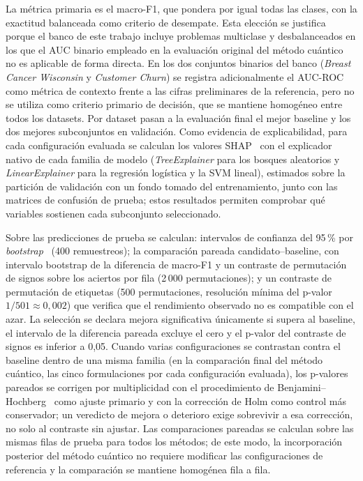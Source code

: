La métrica primaria es el macro-F1, que pondera por igual todas las
clases, con la exactitud balanceada como criterio de desempate. Esta
elección se justifica porque el banco de este trabajo incluye problemas
multiclase y desbalanceados en los que el AUC binario empleado en la
evaluación original del método cuántico~\cite{orquin2026} no es
aplicable de forma directa. En los dos conjuntos binarios del banco
(\textit{Breast Cancer Wisconsin} y \textit{Customer Churn}) se
registra adicionalmente el AUC-ROC como métrica de contexto frente a
las cifras preliminares de la referencia, pero no se utiliza como criterio primario de
decisión, que se mantiene homogéneo entre todos los datasets.
Por dataset pasan a la evaluación final el mejor baseline y los dos
mejores subconjuntos en validación. Como evidencia de explicabilidad,
para cada configuración evaluada se calculan los valores
SHAP~\cite{lundberg2017} con el explicador nativo de cada familia de
modelo (\textit{TreeExplainer} para los bosques aleatorios y
\textit{LinearExplainer} para la regresión logística y la SVM lineal),
estimados sobre la partición de validación con un fondo tomado del
entrenamiento, junto con las matrices de confusión de prueba; estos
resultados permiten comprobar qué variables sostienen cada subconjunto
seleccionado.

Sobre las predicciones de prueba se calculan: intervalos de confianza
del 95\,\% por \textit{bootstrap}~\cite{efron1979} (400 remuestreos);
la comparación pareada candidato--baseline, con intervalo bootstrap de
la diferencia de macro-F1 y un contraste de permutación de signos
sobre los aciertos por fila (2\,000 permutaciones); y un contraste de
permutación de etiquetas (500 permutaciones, resolución mínima del
p-valor $1/501 \approx 0{,}002$) que verifica que el rendimiento
observado no es compatible con el azar. La selección se declara mejora
significativa únicamente si supera al baseline, el intervalo de la
diferencia pareada excluye el cero y el p-valor del contraste de
signos es inferior a 0{,}05. Cuando varias configuraciones se contrastan
contra el baseline dentro de una misma familia (en la comparación final
del método cuántico, las cinco formulaciones por cada configuración
evaluada), los p-valores pareados se corrigen por multiplicidad con el
procedimiento de Benjamini--Hochberg~\cite{benjamini1995} como ajuste
primario y con la corrección de Holm como control más conservador; un
veredicto de mejora o deterioro exige sobrevivir a esa corrección, no solo
al contraste sin ajustar. Las comparaciones pareadas se calculan sobre
las mismas filas de prueba para todos los métodos; de este modo, la
incorporación posterior del método cuántico no requiere modificar las
configuraciones de referencia y la comparación se mantiene homogénea
fila a fila.

